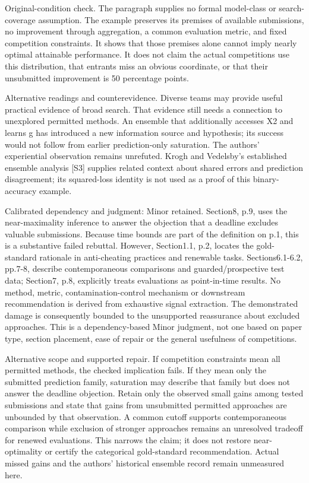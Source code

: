 \documentclass[10pt]{article}
\begin{document}
Original-condition check. The paragraph supplies no formal model-class or search-coverage assumption. The example preserves its premises of available submissions, no improvement through aggregation, a common evaluation metric, and fixed competition constraints. It shows that those premises alone cannot imply nearly optimal attainable performance. It does not claim the actual competitions use this distribution, that entrants miss an obvious coordinate, or that their unsubmitted improvement is 50 percentage points.\par
Alternative readings and counterevidence. Diverse teams may provide useful practical evidence of broad search. That evidence still needs a connection to unexplored permitted methods. An ensemble that additionally accesses X2 and learns g has introduced a new information source and hypothesis; its success would not follow from earlier prediction-only saturation. The authors’ experiential observation remains unrefuted. Krogh and Vedelsby’s established ensemble analysis [S3] supplies related context about shared errors and prediction disagreement; its squared-loss identity is not used as a proof of this binary-accuracy example.\par
Calibrated dependency and judgment: Minor retained. Section8, p.9, uses the near-maximality inference to answer the objection that a deadline excludes valuable submissions. Because time bounds are part of the definition on p.1, this is a substantive failed rebuttal. However, Section1.1, p.2, locates the gold-standard rationale in anti-cheating practices and renewable tasks. Sections6.1-6.2, pp.7-8, describe contemporaneous comparisons and guarded/prospective test data; Section7, p.8, explicitly treats evaluations as point-in-time results. No method, metric, contamination-control mechanism or downstream recommendation is derived from exhaustive signal extraction. The demonstrated damage is consequently bounded to the unsupported reassurance about excluded approaches. This is a dependency-based Minor judgment, not one based on paper type, section placement, ease of repair or the general usefulness of competitions.\par
Alternative scope and supported repair. If competition constraints mean all permitted methods, the checked implication fails. If they mean only the submitted prediction family, saturation may describe that family but does not answer the deadline objection. Retain only the observed small gains among tested submissions and state that gains from unsubmitted permitted approaches are unbounded by that observation. A common cutoff supports contemporaneous comparison while exclusion of stronger approaches remains an unresolved tradeoff for renewed evaluations. This narrows the claim; it does not restore near-optimality or certify the categorical gold-standard recommendation. Actual missed gains and the authors’ historical ensemble record remain unmeasured here.\par
\end{document}
